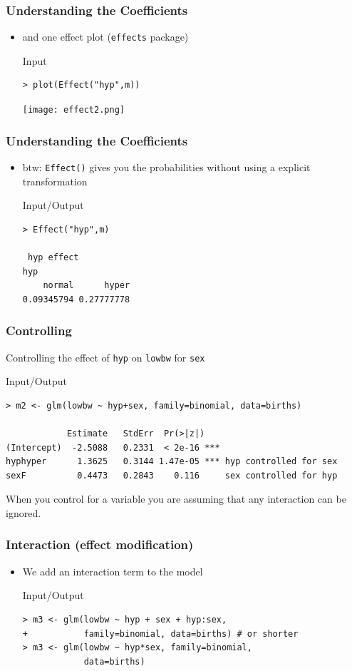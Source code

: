 \begin{frame}[fragile]\frametitle{Understanding the Coefficients}
\begin{itemize}
\item and one effect plot (\texttt{effects} package)
  \begin{exampleblock}{Input}
\begin{verbatim}
> plot(Effect("hyp",m))
\end{verbatim}
  \end{exampleblock}
\begin{center}
\texttt{[image: effect2.png]}
\end{center}
\end{itemize}
\end{frame}


\begin{frame}[fragile]\frametitle{Understanding the Coefficients}
\begin{itemize}
\item btw: \texttt{Effect()} gives you the probabilities without using a explicit transformation
  \begin{exampleblock}{Input/Output}
\begin{verbatim}
> Effect("hyp",m)

 hyp effect
hyp
    normal      hyper 
0.09345794 0.27777778 
\end{verbatim}
  \end{exampleblock}
\end{itemize}
\end{frame}


\begin{frame}[fragile]\frametitle{Controlling}
Controlling the effect of \texttt{hyp} on \texttt{lowbw} for \texttt{sex}\footnotesize
\begin{exampleblock}{Input/Output}
\begin{verbatim}
> m2 <- glm(lowbw ~ hyp+sex, family=binomial, data=births)

            Estimate   StdErr  Pr(>|z|)    
(Intercept)  -2.5088   0.2331  < 2e-16 ***
hyphyper      1.3625   0.3144 1.47e-05 *** hyp controlled for sex
sexF          0.4473   0.2843    0.116     sex controlled for hyp
\end{verbatim}
\end{exampleblock}
\normalsize
When you control for a variable you are assuming that any interaction can be ignored.
\end{frame}


\begin{frame}[fragile]\frametitle{Interaction (effect modification)}
\begin{itemize}
\item We add an interaction term to the model\small
  \begin{exampleblock}{Input/Output}
\begin{verbatim}
> m3 <- glm(lowbw ~ hyp + sex + hyp:sex, 
+           family=binomial, data=births) # or shorter
> m3 <- glm(lowbw ~ hyp*sex, family=binomial, 
            data=births)
\end{verbatim}
  \end{exampleblock}
\end{itemize}
\end{frame}

